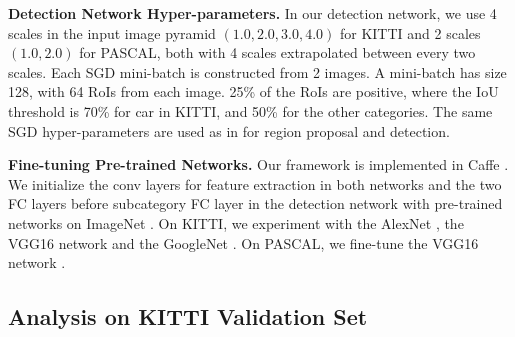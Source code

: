\documentclass[10pt,twocolumn,letterpaper]{article}
\begin{document}
\noindent \textbf{Detection Network Hyper-parameters.} In our detection network, we use 4 scales in the input image pyramid $(1.0, 2.0, 3.0, 4.0)$ for KITTI and 2 scales $(1.0, 2.0)$ for PASCAL, both with 4 scales extrapolated between every two scales. Each SGD mini-batch is constructed from 2 images. A mini-batch has size 128, with 64 RoIs from each image. 25\% of the RoIs are positive, where the IoU threshold is 70\% for car in KITTI, and 50\% for the other categories. The same SGD hyper-parameters are used as in \cite{girshick2015fast} for region proposal and detection.

\noindent \textbf{Fine-tuning Pre-trained Networks.} Our framework is implemented in Caffe \cite{jia2014caffe}. We initialize the conv layers for feature extraction in both networks and the two FC layers before subcategory FC layer in the detection network with pre-trained networks on ImageNet \cite{ILSVRC15}. On KITTI, we experiment with the AlexNet \cite{krizhevsky2012imagenet}, the VGG16 network \cite{simonyan2014very} and the GoogleNet \cite{googlenet}. On PASCAL, we fine-tune the VGG16 network \cite{simonyan2014very}. 

\subsection{Analysis on KITTI Validation Set}
\end{document}
